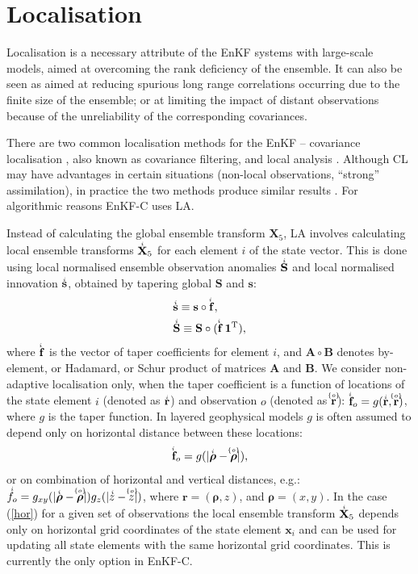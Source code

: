 \documentclass[11pt]{report}
\newcommand{\mb} {\mathbf}
\newcommand{\ms} {\boldsymbol}
\newcommand{\T}{^{\tiny \mathrm T}}
\newcommand{\ac}{\accentset}
\begin{document}
\section{Localisation}

Localisation is a necessary attribute of the EnKF systems with large-scale models, aimed at overcoming the rank deficiency of the ensemble.
It can also be seen as aimed at reducing spurious long range correlations occurring due to the finite size of the ensemble; or at limiting the impact of distant observations because of the unreliability of the corresponding covariances.

There are two common localisation methods for the EnKF -- covariance localisation \citep[CL,][]{ham01b, hou01a}, also known as covariance filtering, and local analysis \citep[LA,][]{eve03a, ott03a}.
Although CL may have advantages in certain situations (non-local observations, ``strong'' assimilation), in practice the two methods produce similar results \citep{sak11a}.
For algorithmic reasons EnKF-C uses LA.

Instead of calculating the global ensemble transform $\mb X_5$, LA involves calculating local ensemble transforms $\ac{i}{\mb X}_5$ for each element $i$ of the state vector.
This is done using local normalised ensemble observation anomalies $\ac{i}{\mb S}$ and local normalised innovation $\ac{i}{\mb s}$, obtained by tapering global $\mb S$ and $\mb s$:
\begin{subequations}
  \begin{align}
    &\ac{i}{\mb s} \equiv \mb s \circ \ac{i}{\mb f},\\
    &\ac{i}{\mb S} \equiv \mb S \circ (\ac{i}{\mb f} \, \mb 1\T),
  \end{align}
\end{subequations}
where $\ac{i}{\mb f}$ is the vector of taper coefficients for element $i$, and $\mb A \circ \mb B$ denotes by-element, or Hadamard, or Schur product of matrices $\mb A$ and $\mb B$.
We consider non-adaptive localisation only, when the taper coefficient is a function of locations of the state element $i$ (denoted as $\ac{i}{\mb r}$) and observation $o$ (denoted as $\ac{\{o\}}{\mb r}$): $\ac{i}{\mb f}_o = g(\ac{i}{\mb r}, \ac{\{o\}}{\mb r})$, where $g$ is the taper function.
In layered geophysical models $g$ is often assumed to depend only on horizontal distance between these locations: 
\begin{align}
  \label{hor}
  \ac{i}{\mb f}_o = g(|\ac{i}{\ms \rho} - \ac{\{o\}}{\ms \rho}|),
\end{align}
or on combination of horizontal and vertical distances, e.g.: $\ac{i}f_o = g_{xy}(|\ac{i}{\ms \rho} - \ac{\{o\}}{\ms \rho}|)g_z(|\ac{i}z - \ac{\{o\}}z|)$, where $\mb r = (\ms \rho, z)$, and $\ms \rho = (x, y)$.
In the case (\ref{hor}) for a given set of observations the local ensemble transform $\ac{i}{\mb X}_5$ depends only on horizontal grid coordinates of the state element $\mb x_i$ and can be used for updating all state elements with the same horizontal grid coordinates.
This is currently the only option in EnKF-C.
\end{document}
